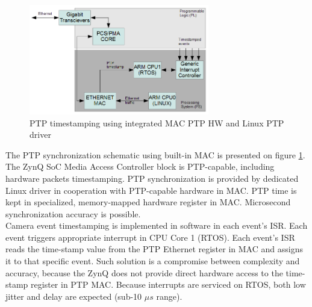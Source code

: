 \begin{figure}[H]
\centering
\includegraphics[width=0.7\textwidth]{pict/soft_ptp.png}
\caption{PTP timestamping using integrated MAC PTP HW and Linux PTP driver}
\label{fig:softptp}
\end{figure}

The PTP synchronization schematic using built-in MAC is presented on figure \ref{fig:softptp}.
The ZynQ SoC Media Access Controller block is PTP-capable, including hardware packets timestamping. PTP synchronization is provided by dedicated Linux driver in cooperation with PTP-capable hardware in MAC. PTP time is kept in specialized, memory-mapped hardware register in MAC.  Microsecond synchronization accuracy is possible. \\
Camera event timestamping is implemented in software in each event's ISR. Each event triggers appropriate interrupt in CPU Core 1 (RTOS). Each event's ISR reads the time-stamp value from the PTP Ethernet register in MAC and assigns it to that specific event. Such solution is a compromise between complexity and accuracy, because the ZynQ does not provide direct hardware access to the time-stamp register in PTP MAC. Because interrupts are serviced on RTOS, both low jitter and delay are expected (sub-10 $\mu s$ range).